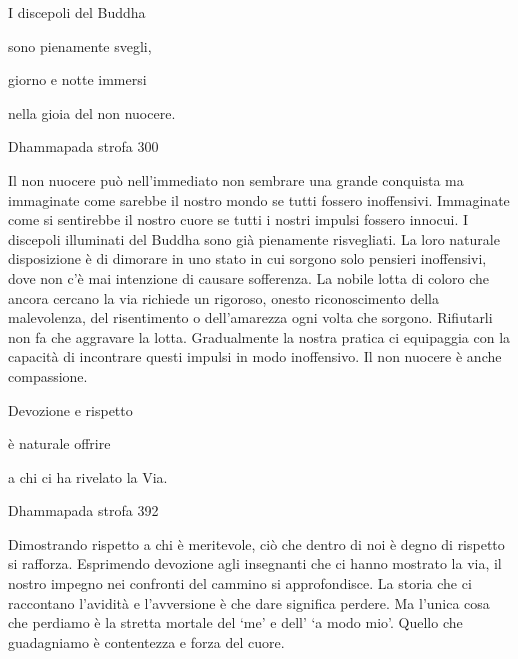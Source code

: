 \documentclass[a4paper,portrait,12pt]{article}
\begin{document}
\newpage



I discepoli del Buddha


sono pienamente svegli,


giorno e notte immersi


nella gioia del non nuocere.





Dhammapada strofa 300


\newpage



Il non nuocere pu\`{o} nell'immediato non sembrare una grande conquista ma immaginate come sarebbe il nostro mondo se tutti fossero inoffensivi. Immaginate come si sentirebbe il nostro cuore se tutti i nostri impulsi fossero innocui. I discepoli illuminati del Buddha sono gi\`{a} pienamente risvegliati. La loro naturale disposizione \`{e} di dimorare in uno stato in cui sorgono solo pensieri inoffensivi, dove non c'\`{e} mai intenzione di causare sofferenza. La nobile lotta di coloro che ancora cercano la via richiede un rigoroso, onesto riconoscimento della malevolenza, del risentimento o dell'amarezza ogni volta che sorgono. Rifiutarli non fa che aggravare la lotta. Gradualmente la nostra pratica ci equipaggia con la capacit\`{a} di incontrare questi impulsi in modo inoffensivo. Il non nuocere \`{e} anche compassione.


\newpage



Devozione e rispetto


\`{e} naturale offrire


a chi ci ha rivelato la Via.





Dhammapada strofa 392


\newpage



Dimostrando rispetto a chi \`{e} meritevole, ci\`{o} che dentro di noi \`{e} degno di rispetto si rafforza. Esprimendo devozione agli insegnanti che ci hanno mostrato la via, il nostro impegno nei confronti del cammino si approfondisce. La storia che ci raccontano l'avidit\`{a} e l'avversione \`{e} che dare significa perdere. Ma l'unica cosa che perdiamo \`{e} la stretta mortale del `me' e  dell' `a modo mio'. Quello che guadagniamo \`{e} contentezza e forza del cuore.


\newpage
\end{document}
